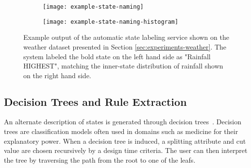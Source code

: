 \begin{figure}[h!]
	\centering
	\begin{subfigure}{.48\columnwidth}
	  	\centering
	  	\texttt{[image: example-state-naming]}
	\end{subfigure}
	\begin{subfigure}{.48\columnwidth}
	  	\centering
	  	\texttt{[image: example-state-naming-histogram]}
	\end{subfigure}
	\caption{Example output of the automatic state labeling service shown on the weather dataset presented in Section \ref{sec:experiments-weather}. The system labeled the bold state on the left hand side as "Rainfall HIGHEST", matching the inner-state distribution of rainfall shown on the right hand side.}
	\label{fig:example-naming}
\end{figure}

\iffalse
In order to assist the user in identifying the meaning of states, the system provides automatic default
state names, based on the distribution of attributes in the state. Each state is given a default name
by combining its most outstanding attribute with a discrete level: LOWEST, LOW, HIGH or
HIGHEST.

The attribute and the level are chosen by comparing its distribution inside the state to the global
distribution in all the states through histograms. This is achieved by first computing the percentiles
of the global distribution. The $40^{th}$ percentile is then computed for the state distribution and
compared against the global distribution. If this percentile lies below the $25^{th}$ or $12^{th}$
percentile, the state is marked with LOW or LOWEST respectively. The final name is chosen according
to the attribute which lies in the lowest percentile.
\fi

\subsection{Decision Trees and Rule Extraction}

An alternate description of states is generated through decision trees~\cite{Witten:2005:DMP:1205860}. Decision
trees are classification models often used in domains such as medicine for their explanatory power.
When a decision tree is induced, a splitting attribute and cut value are chosen recursively by a
design time criteria. The user can then interpret the tree by traversing the path from the root 
to one of the leafs.

